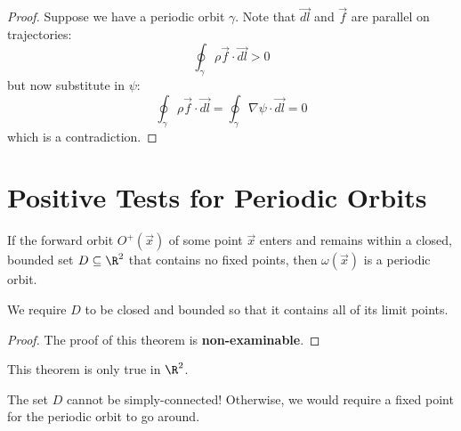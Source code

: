 \documentclass[../Main.tex]{subfiles}
\begin{document}
\begin{proof}
    Suppose we have a periodic orbit $\gamma$. Note that $\vec{dl}$ and $\vec{f}$ are parallel on trajectories:
    \begin{equation*}
        \oint_\gamma \rho \vec{f} \cdot \vec{dl} > 0
    \end{equation*}
    but now substitute in $\psi$:
    \begin{equation*}
        \oint_\gamma \rho \vec{f} \cdot \vec{dl} = \oint_\gamma \nabla \psi \cdot \vec{dl} = 0
    \end{equation*}
    which is a contradiction.
\end{proof}
\section{Positive Tests for Periodic Orbits}
\begin{theorem}
    If the forward orbit $O^+(\vec{x})$ of some point $\vec{x}$ enters and remains within a closed, bounded set $D \subseteq \R^2$ that contains no fixed points, then $\omega(\vec{x})$ is a periodic orbit.
    \label{thmPoincBendix}
\end{theorem}
\begin{remark}
    We require $D$ to be closed and bounded so that it contains all of its limit points.
\end{remark}
\begin{proof}
    The proof of this theorem is \textbf{non-examinable}.
\end{proof}
\begin{remarks}
    \item This theorem is only true in $\R^2$.
    \item The set $D$ cannot be simply-connected! Otherwise, we would require a fixed point for the periodic orbit to go around.
\end{remarks}
\end{document}
